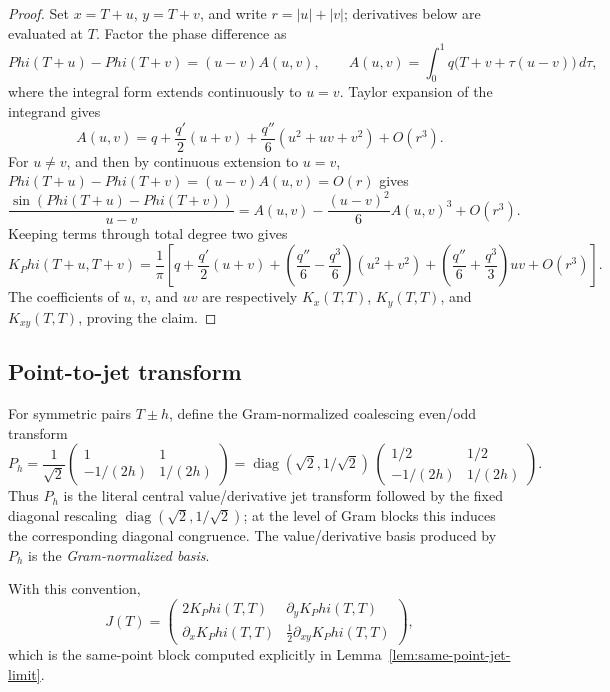 \documentclass[11pt,a4paper]{amsart}
\def\Phi{Phi}%
\numberwithin{equation}{section}
\theoremstyle{plain}
\theoremstyle{definition}
\newcommand{\Ph}{\Phi}
\newcommand{\diag}{\operatorname{diag}}
\begin{document}
\begin{proof}
Set \(x=T+u\), \(y=T+v\), and write \(r=|u|+|v|\); derivatives below
are evaluated at \(T\).  Factor the phase difference as
\[
\Ph(T+u)-\Ph(T+v)=(u-v)A(u,v),\qquad
A(u,v)=\int_0^1 q\bigl(T+v+\tau(u-v)\bigr)\,d\tau,
\]
where the integral form extends continuously to \(u=v\).  Taylor
expansion of the integrand gives
\[
A(u,v)
= q+\frac{q'}2(u+v)+\frac{q''}{6}(u^2+uv+v^2)+O(r^3).
\]
For \(u\ne v\), and then by continuous extension to \(u=v\),
\(\Ph(T+u)-\Ph(T+v)=(u-v)A(u,v)=O(r)\) gives
\[
\frac{\sin(\Ph(T+u)-\Ph(T+v))}{u-v}
= A(u,v)-\frac{(u-v)^2}{6}A(u,v)^3+O(r^3).
\]
Keeping terms through total degree two gives
\[
K_\Ph(T+u,T+v)
= \frac1\pi\!\left[
 q + \frac{q'}{2}(u+v)
 + \!\left(\frac{q''}{6} - \frac{q^3}{6}\right)\!(u^2+v^2)
 + \!\left(\frac{q''}{6} + \frac{q^3}{3}\right)\!uv
 + O(r^3)\right].
\]
The coefficients of \(u\), \(v\), and \(uv\) are respectively
\(K_x(T,T)\), \(K_y(T,T)\), and \(K_{xy}(T,T)\), proving the claim.
\end{proof}

\subsection{Point-to-jet transform}
\label{subsec:point-to-jet-transform}

For symmetric pairs \(T\pm h\), define the Gram-normalized coalescing
even/odd transform
\begin{equation}
\label{eq:point-to-jet-transform}
P_h
=\frac1{\sqrt2}
\begin{pmatrix}
1 & 1\\[0.6ex]
-1/(2h) & 1/(2h)
\end{pmatrix}
=\diag(\sqrt 2, 1/\sqrt 2)\,
\begin{pmatrix}
1/2 & 1/2\\[0.6ex]
-1/(2h) & 1/(2h)
\end{pmatrix}.
\end{equation}
Thus \(P_h\) is the literal central value/derivative jet transform
followed by the fixed diagonal rescaling
\(\diag(\sqrt 2, 1/\sqrt 2)\); at the level of Gram blocks this induces
the corresponding diagonal congruence.  The value/derivative basis
produced by \(P_h\) is the \emph{Gram-normalized basis}.

With this convention,
\begin{equation}
\label{eq:same-point-as-kernel-derivatives}
J(T)=
\begin{pmatrix}
2K_\Ph(T,T) & \partial_y K_\Ph(T,T)\\[0.6ex]
\partial_x K_\Ph(T,T) & \tfrac12 \partial_{xy} K_\Ph(T,T)
\end{pmatrix},
\end{equation}
which is the same-point block computed explicitly in
Lemma~\ref{lem:same-point-jet-limit}.
\end{document}
